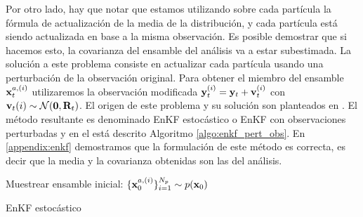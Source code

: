 Por otro lado, hay que notar que estamos utilizando sobre cada partícula la fórmula de actualización de la media de la distribución, y cada partícula está siendo actualizada en base a la misma observación. Es posible demostrar que si hacemos esto, la covarianza del ensamble del análisis va a estar subestimada. La solución a este problema consiste en actualizar cada partícula usando una perturbación de la observación original. Para obtener el miembro del ensamble $\mathbf{x}_t^{a, (i)}$ utilizaremos la observación modificada $\mathbf{y}_t^{(i)} = \mathbf{y}_t + \mathbf{v}_t^{(i)}$ con $\mathbf{v}_t{(i)} \sim \mathcal{N}(\mathbf{0}, \mathbf{R}_t)$. El origen de este problema y su solución son planteados en \cite{Burgers1998}. El método resultante es denominado EnKF estocástico o EnKF con observaciones perturbadas y en el está descrito Algoritmo \ref{algo:enkf_pert_obs}. En \ref{appendix:enkf} demostramos que la formulación de este método es correcta, es decir que la media y la covarianza obtenidas son las del análisis.

\begin{algorithm}[H]\label{algo:enkf_pert_obs}
    Muestrear ensamble inicial: $\{\mathbf{x}_0^{a, (i)} \}_{i=1}^{N_p} \sim p(\mathbf{x}_0)$
    
\caption{EnKF estocástico}
\end{algorithm}

